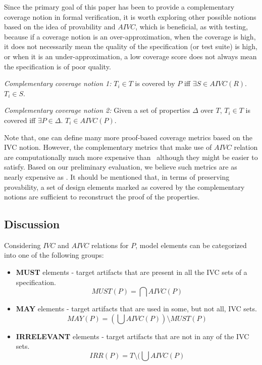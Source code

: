 Since the primary goal of
 this paper has been to provide a complementary coverage notion in
  formal verification, it is worth exploring other possible notions based on the idea of provability and $AIVC$, which is beneficial, as with testing, because if a coverage notion is an over-approximation, when the coverage
 is high, it does not necessarily mean the quality of
 the specification (or test suite) is high, or when it is an under-approximation, a low coverage score does not always mean the specification is of poor quality.

\begin{definition} {\emph{Complementary coverage notion 1:}}
  \label{def:comp-1}
   $T_i \in T$ is covered by $P$ iff $ \exists S
   \in AIVC(R)$. $T_i \in S$.
\end{definition}

\begin{definition} {\emph{Complementary coverage notion 2:}}
  \label{def:comp-2}
   Given a set of properties $\Delta$ over $T$, $T_i \in T$ is covered iff $\exists P \in \Delta$. $T_i \in AIVC(P)$.
\end{definition}

Note that, one can define many more proof-based coverage metrics based on the IVC notion. However, the complementary metrics that make use of $AIVC$ relation are computationally much more expensive than \ivccov\ although they might be easier to satisfy. Based on our preliminary evaluation, we believe such metrics are as nearly expensive as \nondetcov. It should be mentioned that, in terms of preserving provability, a set of design elements marked as covered by the complementary notions are
sufficient to reconstruct the proof of the properties.


\subsection{Discussion}
\label{subsec:method-disc}

Considering $IVC$ and $AIVC$ relations for $P$, model elements can be categorized into one of the following groups:

\begin{itemize}
  \item \textbf{MUST} elements - target artifacts that are present in all the IVC sets of a specification.
      \[
      MUST (P) = \bigcap AIVC(P)
      \]

  \item \textbf{MAY} elements - target artifacts that are used in some, but not all, IVC sets.
      \[
      MAY(P) = (\bigcup AIVC (P)) \setminus MUST (P)
      \]

  \item \textbf{IRRELEVANT} elements - target artifacts that are not in any of the IVC sets.
  $$IRR(P) = T \setminus (\bigcup AIVC (P)$$
\end{itemize}

